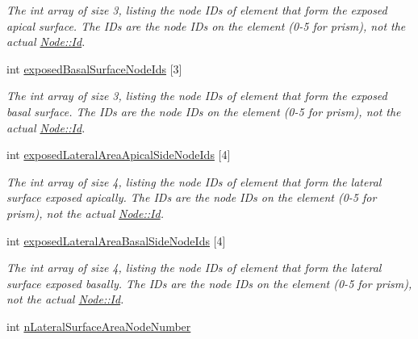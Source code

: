 \begin{DoxyCompactItemize}
\begin{DoxyCompactList}\small\item\em The int array of size 3, listing the node I\+Ds of element that form the exposed apical surface. The I\+Ds are the node I\+Ds on the element (0-\/5 for prism), not the actual \hyperlink{classNode_a1bd379569cc1a8b96432e61971aed4d9}{Node\+::\+Id}. \end{DoxyCompactList}\item 
\hypertarget{classShapeBase_a7bc7714f5622b21ec7fba51e1136803f}{}int \hyperlink{classShapeBase_a7bc7714f5622b21ec7fba51e1136803f}{exposed\+Basal\+Surface\+Node\+Ids} \mbox{[}3\mbox{]}\label{classShapeBase_a7bc7714f5622b21ec7fba51e1136803f}

\begin{DoxyCompactList}\small\item\em The int array of size 3, listing the node I\+Ds of element that form the exposed basal surface. The I\+Ds are the node I\+Ds on the element (0-\/5 for prism), not the actual \hyperlink{classNode_a1bd379569cc1a8b96432e61971aed4d9}{Node\+::\+Id}. \end{DoxyCompactList}\item 
\hypertarget{classShapeBase_a2724f82bbf8c657c075826f953f0b7f2}{}int \hyperlink{classShapeBase_a2724f82bbf8c657c075826f953f0b7f2}{exposed\+Lateral\+Area\+Apical\+Side\+Node\+Ids} \mbox{[}4\mbox{]}\label{classShapeBase_a2724f82bbf8c657c075826f953f0b7f2}

\begin{DoxyCompactList}\small\item\em The int array of size 4, listing the node I\+Ds of element that form the lateral surface exposed apically. The I\+Ds are the node I\+Ds on the element (0-\/5 for prism), not the actual \hyperlink{classNode_a1bd379569cc1a8b96432e61971aed4d9}{Node\+::\+Id}. \end{DoxyCompactList}\item 
\hypertarget{classShapeBase_a28b58f2840dd8ffd571c647534ad9f0b}{}int \hyperlink{classShapeBase_a28b58f2840dd8ffd571c647534ad9f0b}{exposed\+Lateral\+Area\+Basal\+Side\+Node\+Ids} \mbox{[}4\mbox{]}\label{classShapeBase_a28b58f2840dd8ffd571c647534ad9f0b}

\begin{DoxyCompactList}\small\item\em The int array of size 4, listing the node I\+Ds of element that form the lateral surface exposed basally. The I\+Ds are the node I\+Ds on the element (0-\/5 for prism), not the actual \hyperlink{classNode_a1bd379569cc1a8b96432e61971aed4d9}{Node\+::\+Id}. \end{DoxyCompactList}\item 
\hypertarget{classShapeBase_aef3f3ee95b2ac3ad11edf6723ee76ce5}{}int \hyperlink{classShapeBase_aef3f3ee95b2ac3ad11edf6723ee76ce5}{n\+Lateral\+Surface\+Area\+Node\+Number}\label{classShapeBase_aef3f3ee95b2ac3ad11edf6723ee76ce5}


\end{DoxyCompactItemize}
